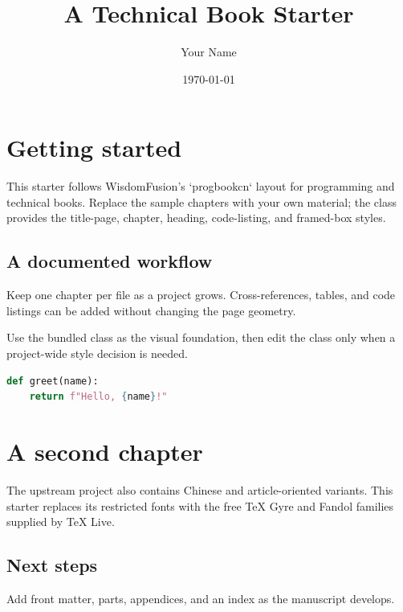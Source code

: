 \documentclass{progbookcn}
\title{A Technical Book Starter}
\author{Your Name}
\date{\today}
\begin{document}
\maketitle
\tableofcontents
\chapter{Getting started}
This starter follows WisdomFusion's `progbookcn` layout for programming and
technical books. Replace the sample chapters with your own material; the class
provides the title-page, chapter, heading, code-listing, and framed-box styles.
\section{A documented workflow}
Keep one chapter per file as a project grows. Cross-references, tables, and
code listings can be added without changing the page geometry.
\begin{tcolorbox}[title=Key point]
Use the bundled class as the visual foundation, then edit the class only when a
project-wide style decision is needed.
\end{tcolorbox}
\begin{lstlisting}[language=Python,caption={A small example}]
def greet(name):
    return f"Hello, {name}!"
\end{lstlisting}
\chapter{A second chapter}
The upstream project also contains Chinese and article-oriented variants. This
starter replaces its restricted fonts with the free TeX Gyre and Fandol
families supplied by TeX Live.
\section{Next steps}
Add front matter, parts, appendices, and an index as the manuscript develops.
\end{document}
